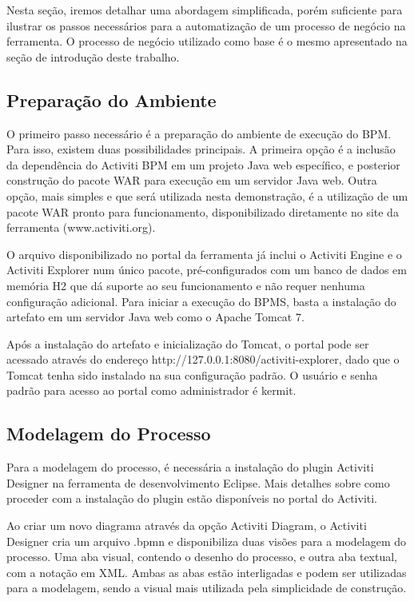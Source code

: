 Nesta seção, iremos detalhar uma abordagem simplificada, porém suficiente para ilustrar os passos necessários para a automatização de um processo de negócio na ferramenta.  O processo de negócio utilizado como base é o mesmo apresentado na seção de introdução deste trabalho.

\subsection{Preparação do Ambiente}\label{sec:automatizacao_processos-automatizar_processo_preparacao_ambiente}

O primeiro passo necessário é a preparação do ambiente de execução do BPM. Para isso, existem duas possibilidades principais. A primeira opção é a inclusão da dependência do Activiti BPM em um projeto Java web específico, e posterior construção do pacote WAR para execução em um servidor Java web. Outra opção, mais simples e que será utilizada nesta demonstração, é a utilização de um pacote WAR pronto para funcionamento, disponibilizado diretamente no site da ferramenta (www.activiti.org).

O arquivo disponibilizado no portal da ferramenta já inclui o Activiti Engine e o Activiti Explorer num único pacote, pré-configurados com um banco de dados em memória H2 que dá suporte ao seu funcionamento e não requer nenhuma configuração adicional. Para iniciar a execução do BPMS, basta a instalação do artefato em um servidor Java web como o Apache Tomcat 7.

Após a instalação do artefato e inicialização do Tomcat, o portal pode ser acessado através do endereço http://127.0.0.1:8080/activiti-explorer, dado que o Tomcat tenha sido instalado na sua configuração padrão. O usuário e senha padrão para acesso ao portal como administrador é kermit.

\subsection{Modelagem do Processo}\label{sec:automatizacao_processos-automatizar_processo_modelagem}

Para a modelagem do processo, é necessária a instalação do plugin Activiti Designer na ferramenta de desenvolvimento Eclipse. Mais detalhes sobre como proceder com a instalação do plugin estão disponíveis no portal do Activiti.

Ao criar um novo diagrama através da opção Activiti Diagram, o Activiti Designer cria um arquivo .bpmn e disponibiliza duas visões para a modelagem do processo. Uma aba visual, contendo o desenho do processo, e outra aba textual, com a notação em XML. Ambas as abas estão interligadas e podem ser utilizadas para a modelagem, sendo a visual mais utilizada pela simplicidade de construção.


